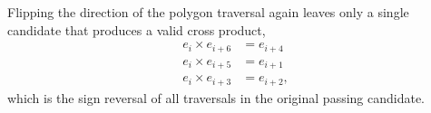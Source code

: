 \documentclass[11pt]{article}
\newcommand{\bv}[1][]{e_{#1}}
\begin{document}
Flipping the direction of the polygon traversal
 again leaves only a single candidate that produces a valid cross product,
 \begin{subequations}
\begin{align}
\bv[i]\times\bv[i+6] &= \bv[i+4] \\
\bv[i]\times\bv[i+5] &= \bv[i+1] \\
\bv[i]\times\bv[i+3] &= \bv[i+2],
\end{align}
\end{subequations}
 which is the sign reversal of all traversals in the original passing candidate.
\end{document}
